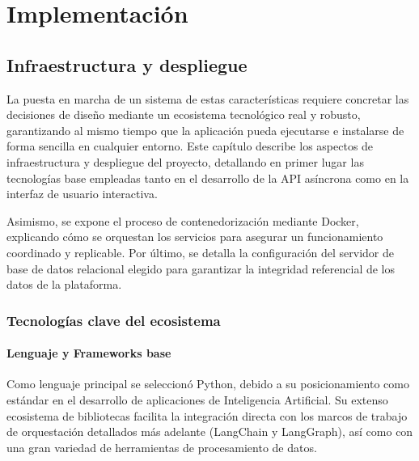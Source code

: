 \documentclass[12pt,a4paper,oneside]{report}
\begin{document}
\part{Implementación}

\chapter{Infraestructura y despliegue}

La puesta en marcha de un sistema de estas características requiere concretar las decisiones de diseño mediante un ecosistema tecnológico real y robusto, garantizando al mismo tiempo que la aplicación pueda ejecutarse e instalarse de forma sencilla en cualquier entorno. Este capítulo describe los aspectos de infraestructura y despliegue del proyecto, detallando en primer lugar las tecnologías base empleadas tanto en el desarrollo de la API asíncrona como en la interfaz de usuario interactiva.

Asimismo, se expone el proceso de contenedorización mediante Docker, explicando cómo se orquestan los servicios para asegurar un funcionamiento coordinado y replicable. Por último, se detalla la configuración del servidor de base de datos relacional elegido para garantizar la integridad referencial de los datos de la plataforma.

\section{Tecnologías clave del ecosistema}

\subsection*{Lenguaje y Frameworks base}

Como lenguaje principal se seleccionó Python, debido a su posicionamiento como estándar en el desarrollo de aplicaciones de Inteligencia Artificial. Su extenso ecosistema de bibliotecas facilita la integración directa con los marcos de trabajo de orquestación detallados más adelante (LangChain y LangGraph), así como con una gran variedad de herramientas de procesamiento de datos.
\end{document}
